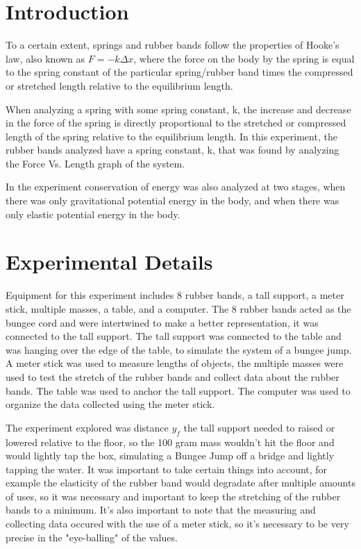 \documentclass[aps,letterpaper,11pt]{revtex4}
\begin{document}
\section{Introduction}

To a certain extent, springs and rubber bands follow the properties of Hooke's law, also known as $F = -k \Delta x$, where the force on the body by the spring is equal to the spring constant of the particular spring/rubber band times the compressed or stretched length relative to the equilibrium length. 

When analyzing a spring with some spring constant, k, the increase and decrease in the force of the spring is directly proportional to the stretched or compressed length of the spring relative to the equilibrium length. In this experiment, the rubber bands analyzed have a spring constant, k, that was found by analyzing the Force Vs. Length graph of the system. 

In the experiment conservation of energy was also analyzed at two stages, when there was only gravitational potential energy in the body, and when there was only elastic potential energy in the body. 

\section{Experimental Details}

Equipment for this experiment includes 8 rubber bands, a tall support, a meter stick, multiple masses, a table, and a computer. The 8 rubber bands acted as the bungee cord and were intertwined to make a better representation, it was connected to the tall support. The tall support was connected to the table and was hanging over the edge of the table, to simulate the system of a bungee jump. A meter stick was used to measure lengths of objects, the multiple masses were used to test the stretch of the rubber bands and collect data about the rubber bands. The table was used to anchor the tall support. The computer was used to organize the data collected using the meter stick.  

The experiment explored was distance $y_f$ the tall support needed to raised or lowered relative to the floor, so the 100 gram mass wouldn't hit the floor and would lightly tap the box, simulating a Bungee Jump off a bridge and lightly tapping the water. It was important to take certain things into account, for example the elasticity of the rubber band would degradate after multiple amounts of uses, so it was necessary and important to keep the stretching of the rubber bands to a minimum. It's also important to note that the measuring and collecting data occured with the use of a meter stick, so it's necessary to be very precise in the "eye-balling" of the values. 
\end{document}
